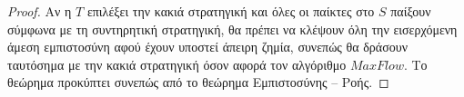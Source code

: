 \begin{proof}
  Αν η $T$ επιλέξει την κακιά στρατηγική και όλες οι παίκτες στο $S$ παίξουν σύμφωνα με τη συντηρητική στρατηγική, θα πρέπει
  να κλέψουν όλη την εισερχόμενη άμεση εμπιστοσύνη αφού έχουν υποστεί άπειρη ζημία, συνεπώς θα δράσουν ταυτόσημα με την κακιά
  στρατηγική όσον αφορά τον αλγόριθμο $MaxFlow$. Το θεώρημα προκύπτει συνεπώς από το θεώρημα Εμπιστοσύνης -- Ροής.
\end{proof}
